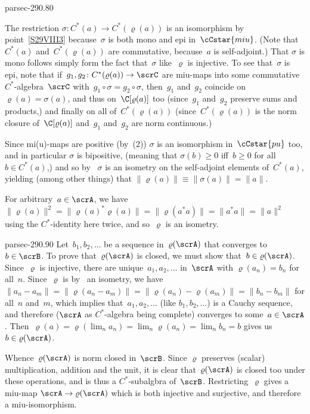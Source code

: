 \documentclass[b5page]{book}
\begin{document}
\begin{solution}{parsec-290.80}
\begin{enumerate}
The restriction $\sigma\colon C^*(a)\to C^*(\varrho(a))$
is an isomorphism by point~\ref{S29VIII3} because~$\sigma$
is both mono and epi in~$\cCstar{miu}$.
(Note that $C^*(a)$ and~$C^*(\varrho(a))$ are commutative,
because~$a$ is self-adjoint.)
That $\sigma$ is mono follows simply form the fact
that~$\sigma$ like~$\varrho$ is injective.
To see that~$\sigma$ is epi,
note that if~$g_1,g_2\colon C^*(\varrho(a))\to\scrC$
are miu-maps into some commutative $C^*$-algebra~$\scrC$
with~$g_1\circ \sigma = g_2\circ \sigma$,
then~$g_1$ and~$g_2$ coincide on~$\varrho(a)=\sigma(a)$,
and thus
on~$\C[\varrho(a)]$ too (since~$g_1$ and~$g_2$ preserve sums and products,)
and finally on all of~$C^*(\varrho(a))$
(since~$C^*(\varrho(a))$ is
the norm closure of~$\C[\varrho(a)]$
and~$g_1$ and~$g_2$ are norm continuous.)

Since mi(u)-maps are positive (by~(2))
$\sigma$ is an isomorphism in~$\cCstar{pu}$ too,
and in particular $\sigma$ is bipositive,
(meaning that $\sigma(b)\geq 0$ iff~$b\geq 0$ for all~$b\in C^*(a)$,)
and so by~
$\sigma$ is an isometry on the self-adjoint elements
of~$C^*(a)$, yielding (among other things) that
$\|\varrho(a)\|\equiv\|\sigma(a)\|= \|a\|$.

For arbitrary~$a\in \scrA$,
we have
$\|\varrho(a)\|^2
= \|\varrho(a)^* \varrho(a)\|
= \|\varrho(a^*a)\|=\|a^*a\|=\|a\|^2$
using the $C^*$-identity here twice,
and so~$\varrho$ is an isometry.
\end{enumerate}
\end{solution}
\begin{solution}{parsec-290.90}
Let~$b_1,b_2,\dotsc$ be a sequence in~$\varrho(\scrA)$
that converges to~$b\in \scrB$. 
To prove that~$\varrho(\scrA)$ is closed,
we must show that~$b\in \varrho(\scrA)$.
Since~$\varrho$ is injective,
there are unique~$a_1,a_2,\dotsc$ in~$\scrA$ with
$\varrho(a_n)=b_n$ for all~$n$.
Since~$\varrho$ is by~
 an isometry,
we have $\|a_n-a_m\|=\|\varrho(a_n - a_m)\|
= \|\varrho(a_n)-\varrho(a_m)\|= \|b_n-b_m\|$
for all~$n$ and~$m$,
which implies that~$a_1,a_2,\dotsc$
(like $b_1,b_2,\dotsc$) is a Cauchy sequence,
and therefore ($\scrA$ as $C^*$-algebra being complete)
converges to some~$a\in\scrA$.
Then~$\varrho(a)=\varrho(\lim_n a_n)=
\lim_n \varrho(a_n)=\lim_n b_n=b$
gives us~$b\in \varrho(\scrA)$.

Whence~$\varrho(\scrA)$ is norm closed in~$\scrB$.
Since $\varrho$ preserves (scalar) multiplication, addition and the unit,
it is clear that~$\varrho(\scrA)$ is closed too
under these operations,
and is thus a $C^*$-subalgbra of~$\scrB$.
Restricting~$\varrho$ gives a miu-map $\scrA\to\varrho(\scrA)$
which is both injective and surjective, and therefore a miu-isomorphism.
\end{solution}
\end{document}

